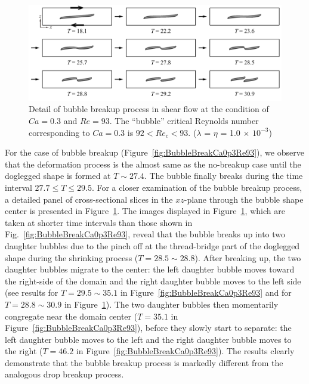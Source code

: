 \documentclass[%
 reprint,
 showkeys,
 amsmath,amssymb,
 aps,
 prfluids,
 onecolumn
]{revtex4-2}
\begin{document}
%
\begin{figure}%
  \centering
  \includegraphics[width=\textwidth]{BubBreakCa0p3Re93Detail}
  \caption{Detail of bubble breakup process in shear flow at the condition
           of $Ca=0.3$ and $Re=93$.
	   The ``bubble'' 
	   critical Reynolds number corresponding to $Ca=0.3$ is
	   $92<Re_{c}<93$.
           ($\lambda$ = $\eta$ = 1.0 $\times$ $10^{-3}$) 
	   }
  \label{fig:BubBreakCa0p3Re93Detail}
\end{figure}
%
For the case of bubble breakup (Figure~\ref{fig:BubbleBreakCa0p3Re93}), we
observe that the deformation process is the almost same as the no-breakup case
until the doglegged shape is formed at $T \sim 27.4$. The bubble finally breaks
during the time interval $27.7 \leq T \leq 29.5$.  For a closer examination of
the bubble breakup process, a detailed panel of cross-sectional slices in the
$xz$-plane through the bubble shape center is presented in
Figure~\ref{fig:BubBreakCa0p3Re93Detail}.  The images displayed in
Figure~\ref{fig:BubBreakCa0p3Re93Detail}, which are taken at shorter time
intervals than those shown in Fig.~\ref{fig:BubbleBreakCa0p3Re93}, reveal that
the bubble breaks up into two daughter bubbles due to the pinch off at the
thread-bridge part of the doglegged shape during the shrinking process ($T =
28.5 \sim 28.8$).  After breaking up, the two daughter bubbles migrate to the
center: the left daughter bubble moves toward the right-side of the domain and
the right daughter bubble moves to the left side (see results for $T = 29.5
\sim 35.1$ in Figure~\ref{fig:BubbleBreakCa0p3Re93} and for $T = 28.8 \sim
30.9$ in Figure~\ref{fig:BubBreakCa0p3Re93Detail}).  The two daughter bubbles
then momentarily congregate near the domain center ($T = 35.1$ in
Figure~\ref{fig:BubbleBreakCa0p3Re93}), before they slowly start to separate:
the left daughter bubble moves to the left and the right daughter bubble moves
to the right ($T = 46.2$ in Figure~\ref{fig:BubbleBreakCa0p3Re93}).  The
results clearly demonstrate that the bubble breakup process is markedly
different from the analogous drop breakup process. 
\end{document}
